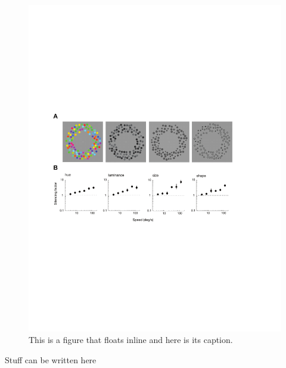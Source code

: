 \begin{figure}
\includegraphics[width=\textwidth]{figures/fig1}
\caption[Short figure name.]{This is a figure that floats inline and here is its caption.
\label{fig:myInlineFigure}}
\end{figure}

Stuff can be written here







